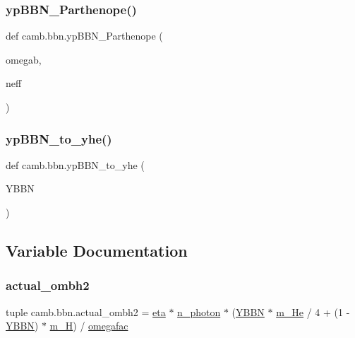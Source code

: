 \subsubsection{\texorpdfstring{yp\+B\+B\+N\+\_\+\+Parthenope()}{ypBBN\_Parthenope()}}
{\footnotesize\ttfamily def camb.\+bbn.\+yp\+B\+B\+N\+\_\+\+Parthenope (\begin{DoxyParamCaption}\item[{}]{omegab,  }\item[{}]{neff }\end{DoxyParamCaption})}

\mbox{\label{namespacecamb_1_1bbn_a9919c33355b5bbeee07634a0aa957b9a}} 
\subsubsection{\texorpdfstring{yp\+B\+B\+N\+\_\+to\+\_\+yhe()}{ypBBN\_to\_yhe()}}
{\footnotesize\ttfamily def camb.\+bbn.\+yp\+B\+B\+N\+\_\+to\+\_\+yhe (\begin{DoxyParamCaption}\item[{}]{Y\+B\+BN }\end{DoxyParamCaption})}



\subsection{Variable Documentation}
\mbox{\label{namespacecamb_1_1bbn_a577a98b4b1732e27cc2e09844a6fe2ee}} 
\subsubsection{\texorpdfstring{actual\+\_\+ombh2}{actual\_ombh2}}
{\footnotesize\ttfamily tuple camb.\+bbn.\+actual\+\_\+ombh2 = \mbox{\hyperlink{namespacecamb_1_1bbn_acbc137606c793f20e1ded220bbfab367}{eta}} $\ast$ \mbox{\hyperlink{namespacecamb_1_1bbn_aa1b409ea1a7b5f583772b3f5cc174be0}{n\+\_\+photon}} $\ast$ (\mbox{\hyperlink{namespacecamb_1_1bbn_ab3d92f46f19b0025c2d5c6e26522b30c}{Y\+B\+BN}} $\ast$ \mbox{\hyperlink{namespacecamb_1_1bbn_addcae6f33c5419e66f9ae3006383c347}{m\+\_\+\+He}} / 4 + (1 -\/ \mbox{\hyperlink{namespacecamb_1_1bbn_ab3d92f46f19b0025c2d5c6e26522b30c}{Y\+B\+BN}}) $\ast$ \mbox{\hyperlink{namespacecamb_1_1bbn_aa3780f95e3d1ace78bfe399ae081a621}{m\+\_\+H}}) / \mbox{\hyperlink{namespacecamb_1_1bbn_a9366441db17c0ca60e0fa48f8a8d796c}{omegafac}}}

